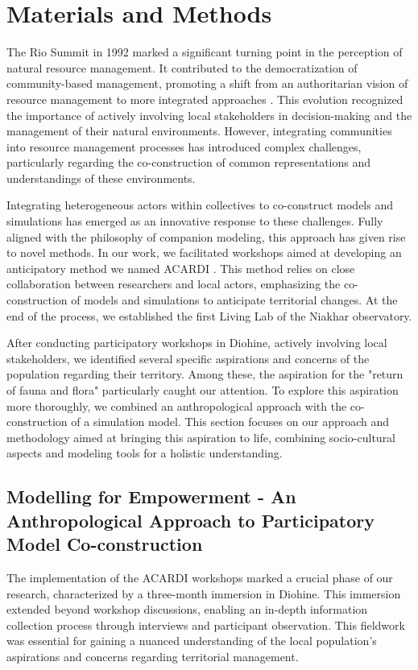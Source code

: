 \documentclass{article}
\begin{document}
\section{Materials and Methods}

The Rio Summit in 1992 marked a significant turning point in the perception of natural resource management. It contributed to the democratization of community-based management, promoting a shift from an authoritarian vision of resource management to more integrated approaches \parencite{delay_coming_2022}. This evolution recognized the importance of actively involving local stakeholders in decision-making and the management of their natural environments. However, integrating communities into resource management processes has introduced complex challenges, particularly regarding the co-construction of common representations and understandings of these environments.

Integrating heterogeneous actors within collectives to co-construct models and simulations has emerged as an innovative response to these challenges. Fully aligned with the philosophy of companion modeling, this approach has given rise to novel methods. In our work, we facilitated workshops aimed at developing an anticipatory method we named ACARDI \parencite{perrotton_definition_2021}. This method relies on close collaboration between researchers and local actors, emphasizing the co-construction of models and simulations to anticipate territorial changes. At the end of the process, we established the first Living Lab of the Niakhar observatory.

After conducting participatory workshops in Diohine, actively involving local stakeholders, we identified several specific aspirations and concerns of the population regarding their territory. Among these, the aspiration for the "return of fauna and flora" particularly caught our attention. To explore this aspiration more thoroughly, we combined an anthropological approach with the co-construction of a simulation model. This section focuses on our approach and methodology aimed at bringing this aspiration to life, combining socio-cultural aspects and modeling tools for a holistic understanding.

\subsection{Modelling for Empowerment - An Anthropological Approach to Participatory Model Co-construction}

The implementation of the ACARDI workshops marked a crucial phase of our research, characterized by a three-month immersion in Diohine. This immersion extended beyond workshop discussions, enabling an in-depth information collection process through interviews and participant observation. This fieldwork was essential for gaining a nuanced understanding of the local population's aspirations and concerns regarding territorial management.
\end{document}

